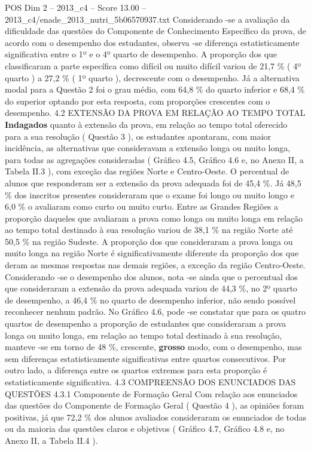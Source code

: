\begin{textsample}{POS Dim 2 – 2013\_c4 – Score 13.00 – 2013\_c4/enade\_2013\_nutri\_5b06570937.txt}
Considerando -se a avaliação da dificuldade das questões do Componente de Conhecimento Específico da prova, de acordo com o desempenho dos estudantes, observa -se diferença estatisticamente significativa entre o 1º e o 4º quarto de desempenho.
A proporção dos que classificaram a parte específica como difícil ou muito difícil variou de 21,7 \% ( 4º quarto ) a 27,2 \% ( 1º quarto ), decrescente com o desempenho.
Já a alternativa modal para a Questão 2 foi o grau médio, com 64,8 \% do quarto inferior e 68,4 \% do superior optando por esta resposta, com proporções crescentes com o desempenho. 4.2 EXTENSÃO DA PROVA EM RELAÇÃO AO TEMPO TOTAL \textbf{Indagados} quanto à extensão da prova, em relação ao tempo total oferecido para a sua resolução ( Questão 3 ), os estudantes apontaram, com maior incidência, as alternativas que consideravam a extensão longa ou muito longa, para todas as agregações consideradas ( Gráfico 4.5, Gráfico 4.6 e, no Anexo II, a Tabela II.3 ), com exceção das regiões Norte e Centro-Oeste.
O percentual de alunos que responderam ser a extensão da prova adequada foi de 45,4 \%.
Já 48,5 \% dos inscritos presentes consideraram que o exame foi longo ou muito longo e 6,0 \% o avaliaram como curto ou muito curto.
Entre as Grandes Regiões a proporção daqueles que avaliaram a prova como longa ou muito longa em relação ao tempo total destinado à sua resolução variou de 38,1 \% na região Norte até 50,5 \% na região Sudeste.
A proporção dos que consideraram a prova longa ou muito longa na região Norte é significativamente diferente da proporção dos que deram as mesmas respostas nas demais regiões, a exceção da região Centro-Oeste.
Considerando -se o desempenho dos alunos, nota -se ainda que o percentual dos que consideraram a extensão da prova adequada variou de 44,3 \%, no 2º quarto de desempenho, a 46,4 \% no quarto de desempenho inferior, não sendo possível reconhecer nenhum padrão.
No Gráfico 4.6, pode -se constatar que para os quatro quartos de desempenho a proporção de estudantes que consideraram a prova longa ou muito longa, em relação ao tempo total destinado à sua resolução, manteve -se em torno de 48 \%, crescente, \textbf{grosso} modo, com o desempenho, mas sem diferenças estatisticamente significativas entre quartos consecutivos.
Por outro lado, a diferença entre os quartos extremos para esta proporção é estatisticamente significativa. 4.3 COMPREENSÃO DOS ENUNCIADOS DAS QUESTÕES 4.3.1 Componente de Formação Geral Com relação aos enunciados das questões do Componente de Formação Geral ( Questão 4 ), as opiniões foram positivas, já que 72,2 \% dos alunos avaliados consideraram os enunciados de todas ou da maioria das questões claros e objetivos ( Gráfico 4.7, Gráfico 4.8 e, no Anexo II, a Tabela II.4 ).

\end{textsample}
